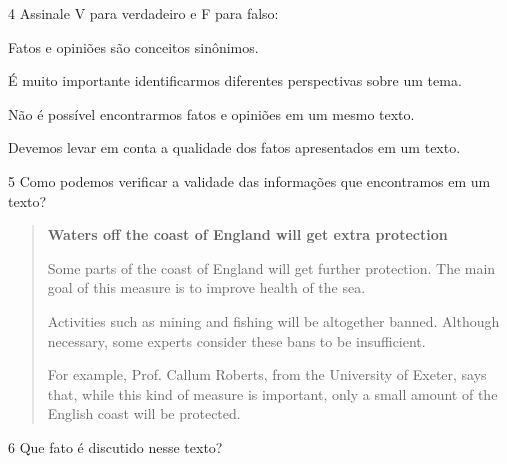\num{4} Assinale V para verdadeiro e F para falso:

\begin{boxlist}
\item Fatos e opiniões são conceitos sinônimos. 

\item É muito importante identificarmos diferentes perspectivas sobre um
tema. 

\item Não é possível encontrarmos fatos e opiniões em um mesmo texto. 

\item Devemos levar em conta a qualidade dos fatos apresentados em um
texto. 
\end{boxlist}

\num{5} Como podemos verificar a validade das informações que encontramos em um texto?





\begin{quote}
\textbf{Waters off the coast of England will get extra protection}

Some parts of the coast of England will get further protection. The main goal of this measure is to improve health of the sea.

Activities such as mining and fishing will be altogether banned. Although necessary, some experts consider these bans to be insufficient.

For example, Prof. Callum Roberts, from the University of Exeter, says that, while this kind of measure is important, only a small amount of the English coast will be protected. 

\end{quote}


\num{6} Que fato é discutido nesse texto?



